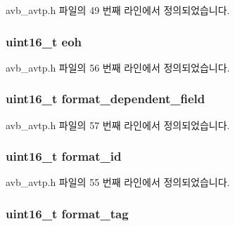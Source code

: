 avb\+\_\+avtp.\+h 파일의 49 번째 라인에서 정의되었습니다.

\subsubsection[{\texorpdfstring{eoh}{eoh}}]{\setlength{\rightskip}{0pt plus 5cm}uint16\+\_\+t eoh}\hypertarget{structsix1883__header_a0cb731a92907e54bc99bdad81dd3552a}{}\label{structsix1883__header_a0cb731a92907e54bc99bdad81dd3552a}


avb\+\_\+avtp.\+h 파일의 56 번째 라인에서 정의되었습니다.

\subsubsection[{\texorpdfstring{format\+\_\+dependent\+\_\+field}{format_dependent_field}}]{\setlength{\rightskip}{0pt plus 5cm}uint16\+\_\+t format\+\_\+dependent\+\_\+field}\hypertarget{structsix1883__header_acd85be38e562935aed45a19b170ae501}{}\label{structsix1883__header_acd85be38e562935aed45a19b170ae501}


avb\+\_\+avtp.\+h 파일의 57 번째 라인에서 정의되었습니다.

\subsubsection[{\texorpdfstring{format\+\_\+id}{format_id}}]{\setlength{\rightskip}{0pt plus 5cm}uint16\+\_\+t format\+\_\+id}\hypertarget{structsix1883__header_adbbe8dd364d054c89e7ffc75986b2d05}{}\label{structsix1883__header_adbbe8dd364d054c89e7ffc75986b2d05}


avb\+\_\+avtp.\+h 파일의 55 번째 라인에서 정의되었습니다.

\subsubsection[{\texorpdfstring{format\+\_\+tag}{format_tag}}]{\setlength{\rightskip}{0pt plus 5cm}uint16\+\_\+t format\+\_\+tag}\hypertarget{structsix1883__header_a137c7a0b8f5c096e24e535416b2c12c2}{}\label{structsix1883__header_a137c7a0b8f5c096e24e535416b2c12c2}


